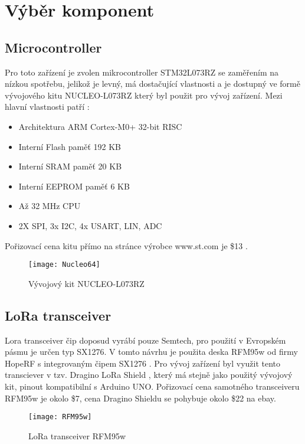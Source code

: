 \section{Výběr komponent}
\subsection{Microcontroller}
Pro toto zařízení je zvolen mikrocontroller STM32L073RZ se zaměřením na nízkou spotřebu, jelikož je levný, má dostačující vlastnosti a je dostupný ve formě vývojového kitu NUCLEO-L073RZ který byl použit pro  vývoj zařízení. Mezi hlavní vlastnosti patří \cite{nucleoST}:
\begin{itemize}    
    \item {Architektura ARM Cortex-M0+ 32-bit RISC}
    \item{Interní Flash paměť 192 KB}
    \item{Interní SRAM paměť 20 KB}
    \item{Interní EEPROM paměť 6 KB}
    \item {Až 32 MHz CPU}
    \item {2X SPI, 3x I2C, 4x USART, LIN, ADC}
\end{itemize}

Pořizovací cena kitu přímo na stránce výrobce www.st.com je \$13 \cite{nucleoST} \cite{nucleoMbed}.
\begin{figure}[!h]
    \centering
    \texttt{[image: Nucleo64]}
    \caption{Vývojový kit NUCLEO-L073RZ \cite{nucleoST}}
    \label{fig:02}
\end{figure}

\subsection{LoRa transceiver}
Lora transceiver čip doposud vyrábí pouze Semtech, pro použití v Evropském pásmu je určen typ SX1276.
V tomto návrhu je použita deska RFM95w od firmy HopeRF s integrovaným čipem SX1276 \cite{RFM95w}.
Pro vývoj zařízení byl využit tento transciever v tzv. Dragino LoRa Shield \cite{draginoWiki}, který má stejně jako použitý vývojový kit, pinout kompatibilní s Arduino UNO. Pořizovací cena samotného transceiveru RFM95w je okolo \$7, cena Dragino Shieldu se pohybuje okolo \$22 na ebay.

\begin{figure}[!h]
    \centering
    \texttt{[image: RFM95w]}
    \caption{LoRa transceiver RFM95w \cite{RFM95w}}
    \label{fig:02}
\end{figure}

